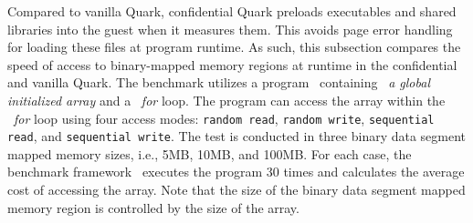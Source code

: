      



 
Compared to vanilla Quark, confidential Quark preloads executables and shared libraries into the guest when it measures them. This avoids page error handling for loading these files at program runtime. As such, this subsection compares the speed of access to binary-mapped memory regions at runtime 
in the confidential and vanilla Quark. The benchmark utilizes a program~\cite*{benchamark_micro} containing ~\emph{a global initialized array} and a ~\emph{for} loop. The program can access the array within the ~\emph{for} loop using four access modes: \texttt{random read}, \texttt{random write}, 
\texttt{sequential read}, and \texttt{sequential write}.  The test is conducted in three binary data segment mapped memory sizes, i.e., 5MB, 10MB, and 100MB. For each case, the benchmark framework~\cite*{benchamark_framework} executes the program 30 times and calculates the average cost of accessing the array. Note that the size of the binary data segment 
mapped memory region is controlled by the size of the array. 


